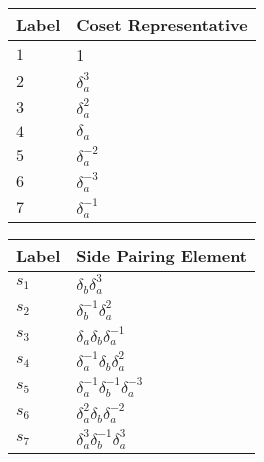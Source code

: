 \documentclass{article}
\begin{document}
\begin{center}
\begin{tabular}{ll}
\toprule
Label & Coset Representative\\
\midrule
$1$ & 1 \\
$2$ & $\delta_a^{3}$ \\
$3$ & $\delta_a^{2}$ \\
$4$ & $\delta_a^{}$ \\
$5$ & $\delta_a^{-2}$ \\
$6$ & $\delta_a^{-3}$ \\
$7$ & $\delta_a^{-1}$ \\
\bottomrule
\end{tabular}
\hfill
\begin{tabular}{ll}
\toprule
Label & Side Pairing Element\\
\midrule
$s_{1}$ & $\delta_b^{}\delta_a^{3}$ \\
$s_{2}$ & $\delta_b^{-1}\delta_a^{2}$ \\
$s_{3}$ & $\delta_a^{}\delta_b^{}\delta_a^{-1}$ \\
$s_{4}$ & $\delta_a^{-1}\delta_b^{}\delta_a^{2}$ \\
$s_{5}$ & $\delta_a^{-1}\delta_b^{-1}\delta_a^{-3}$ \\
$s_{6}$ & $\delta_a^{2}\delta_b^{}\delta_a^{-2}$ \\
$s_{7}$ & $\delta_a^{3}\delta_b^{-1}\delta_a^{3}$ \\
\bottomrule
\end{tabular}
\end{center}

\thispagestyle{empty}
\end{document}

